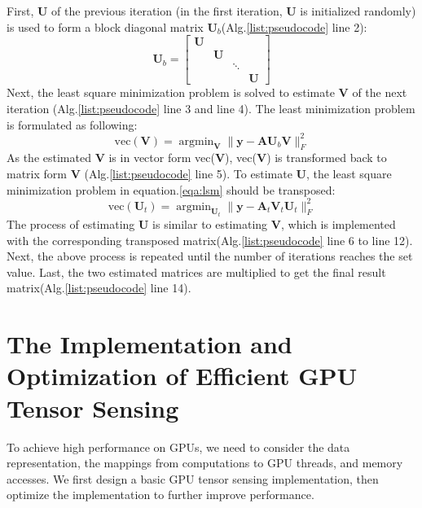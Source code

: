 \documentclass[futureinternet,article,submit,moreauthors,pdftex,10pt,a4paper]{Definitions/mdpi}
\theoremstyle{plain}
\theoremstyle{definition}
\theoremstyle{remark}
\begin{document}
    
    First, $\mathbf{U}$ of the previous iteration (in the first iteration, $\mathbf{U}$ is initialized randomly) is used to form a block diagonal matrix $\mathbf{U}_b$(Alg.\ref{list:pseudocode} line 2):
    \begin{equation}
        \label{eqa:diag}
        \mathbf{U}_b = 
        \begin{bmatrix}
            \mathbf{U} & & & \\
            & \mathbf{U} & & \\
            & & \ddots & \\
            & & & \mathbf{U}
        \end{bmatrix}
    \end{equation}
    Next, the least square minimization problem is solved to estimate $\mathbf{V}$ of the next iteration (Alg.\ref{list:pseudocode} line 3 and line 4). The least minimization problem is formulated as following:
        \begin{equation}
            \label{eqa:lsm}
            \text{vec}(\mathbf{V})=
        \mathop{\arg\min}_{ \mathbf{V}} \| \mathbf{y} - \mathbf{A}\mathbf{U}_b\mathbf{V} \|_F^2
        \end{equation}
        As the estimated $\mathbf{V}$ is in vector form vec($\mathbf{V}$), vec($\mathbf{V}$) is transformed back to matrix form $\mathbf{V}$ (Alg.\ref{list:pseudocode} line 5).
        To estimate $\mathbf{U}$, the least square minimization problem in equation.\ref{eqa:lsm} should be transposed:
        \begin{equation}
            \label{eqa:lsm1}
            \text{vec}(\mathbf{U}_t)=
        \mathop{\arg\min}_{ \mathbf{U}_t} \| \mathbf{y} - \mathbf{A}_t\mathbf{V}_t\mathbf{U}_t \|_F^2
        \end{equation}
        The process of estimating $\mathbf{U}$ is similar to estimating $\mathbf{V}$, which  is implemented with the corresponding transposed matrix(Alg.\ref{list:pseudocode} line 6 to line 12).
        Next, the above process is repeated until the number of iterations reaches the set value.
        Last, the two estimated matrices are multiplied to get the final result matrix(Alg.\ref{list:pseudocode} line 14).
\section{The Implementation and Optimization of Efficient GPU Tensor Sensing}
\label{SEC_GPU}
To achieve high performance on GPUs, we need to consider the data representation, the mappings from computations to GPU threads, and memory accesses. We first design a basic GPU tensor sensing implementation, then optimize the implementation to further improve performance.
\end{document}
